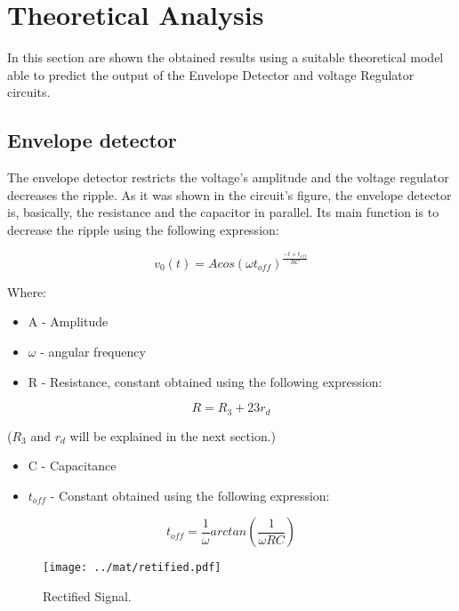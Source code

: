 \section{Theoretical Analysis}
\label{sec:analysis}

In this section are shown the obtained results using a suitable theoretical model able to predict the output of the Envelope Detector and voltage Regulator circuits.

\subsection{Envelope detector}
The envelope detector restricts the voltage's amplitude and the voltage regulator decreases the ripple. As it was shown in the circuit's figure, the envelope detector is, basically, the resistance and the capacitor in parallel. Its main function is to decrease the ripple using the following expression:\par
\begin{equation}
    v_0(t) = Acos(\omega t_{off})^{\frac{-t+t_{off}}{RC}}
\end{equation}\par
Where: \par
\begin{itemize}
  \item A - Amplitude
  \item $\omega$ - angular frequency
  \item R - Resistance, constant obtained using the following expression:
\end{itemize}
\begin{equation}
    R = R_3 + 23r_d 
\end{equation}\par
($R_3$ and $r_d$ will be explained in the next section.)\par
\begin{itemize}
  \item C - Capacitance
  \item $t_{off}$ - Constant obtained using the following expression:
\end{itemize}
\begin{equation}
    t_{off}=\frac{1}{\omega}arctan(\frac{1}{\omega RC})
\end{equation}\par

\begin{figure}[H] \centering
\texttt{[image: ../mat/retified.pdf]}
\caption{Rectified Signal.}
\label{fig:rectified}
\end{figure}

